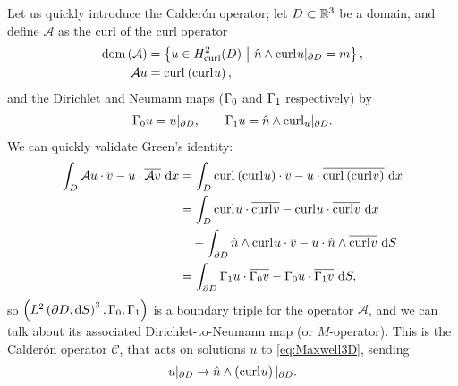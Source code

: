 Let us quickly introduce the Calder\'{o}n operator; let $D\subset\mathbb{R}^3$ be a domain, and define $\mathcal{A}$ as the curl of the curl operator
\begin{align*}
	\mathrm{dom}\left( \mathcal{A} \right) &= \left\{  u\in H^2_{\mathrm{curl}}(D) \ \middle\vert \  \hat{n}\wedge\mathrm{curl}_{}u\vert_{\partial D} = m  \right\}, \\
	\mathcal{A}u &= \mathrm{curl}_{}\left( \mathrm{curl}_{}u \right),
\end{align*}
and the Dirichlet and Neumann maps ($\Gamma_0$ and $\Gamma_1$ respectively) by
\begin{align} \label{eq:ClassicalEM-DNMaps}
	\Gamma_0 u = u\vert_{\partial D}, \qquad
	\Gamma_1 u = \hat{n}\wedge\mathrm{curl}_{u}\vert_{\partial D}.
\end{align}
We can quickly validate Green's identity:
\begin{align*}
	\int_{D} \mathcal{A}u \cdot \overline{v} - u \cdot \overline{\mathcal{A}v}  \ \mathrm{d}x
	&= \int_{D} \mathrm{curl}_{}\left( \mathrm{curl}_{}u \right)\cdot\overline{v} - u\cdot\overline{\mathrm{curl}_{}\left( \mathrm{curl}_{}v \right)}  \ \mathrm{d}x \\
	&= \int_{D} \mathrm{curl}_{}u\cdot\overline{\mathrm{curl}_{}v} - \mathrm{curl}_{}u\cdot\overline{\mathrm{curl}_{}v}  \ \mathrm{d}x \\
	&\quad + \int_{\partial D} \hat{n}\wedge\mathrm{curl}_{}u\cdot\overline{v} - u\cdot\hat{n}\wedge\overline{\mathrm{curl}_{}v}  \ \mathrm{d}S \\
	&= \int_{\partial D} \Gamma_1 u \cdot \overline{\Gamma_0 v} - \Gamma_0 u \cdot \overline{\Gamma_1 v}  \ \mathrm{d}S,
\end{align*}
so $\left( L^{2}\left( \partial D,\mathrm{d} S \right)^3, \Gamma_0, \Gamma_1 \right)$ is a boundary triple for the operator $\mathcal{A}$, and we can talk about its associated Dirichlet-to-Neumann map (or $M$-operator).
This is the Calder\'{o}n operator $\mathcal{C}$, that acts on solutions $u$ to \eqref{eq:Maxwell3D}, sending
\begin{align*}
	u\vert_{\partial D} \rightarrow \hat{n}\wedge\left( \mathrm{curl}_{}u \right)\vert_{\partial D}.
\end{align*}

